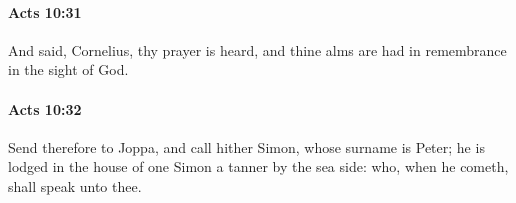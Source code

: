 		\paragraph{Acts 10:31} %
			\label{ACTS-10-31}

			And said, Cornelius, thy prayer is heard, and thine alms are had in remembrance in the sight of God.

			\begin{framed}
			\scriptsize
				\begin{compactdesc}
					\item[SBLG] 
				\end{compactdesc}
			\end{framed}

		\paragraph{Acts 10:32} %
			\label{ACTS-10-32}

			Send therefore to Joppa, and call hither Simon, whose surname is Peter; he is lodged in the house of one Simon a tanner by the sea side: who, when he cometh, shall speak unto thee.


